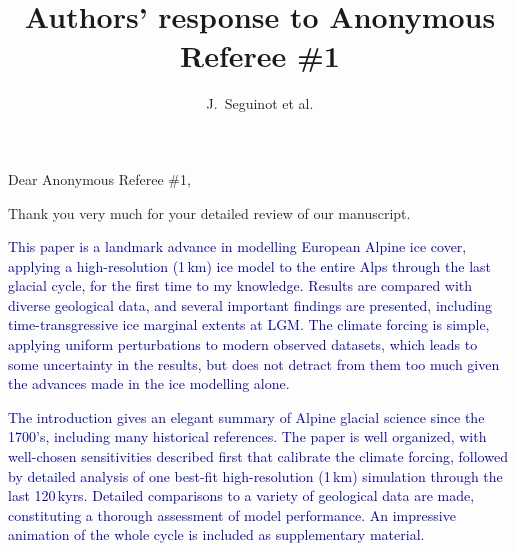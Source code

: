 

\title{Authors' response to Anonymous Referee \#1}
\author{J.~Seguinot et al.}


\maketitle
\bigskip


\newcommand{\sechead}[1]{\bigskip\noindent\textbf{#1}}
\newcommand{\referee}[1]{\bigskip\noindent\textcolor{darkblue}{#1}}
\newcommand{\msquote}[1]{\begin{quote}\textit{#1}\end{quote}}
\newcommand{\doi}[1]{doi:\allowbreak\href{http://dx.doi.org/#1}{#1}}

    Dear Anonymous Referee \#1,

    Thank you very much for your detailed review of our manuscript.

    \referee{%
        This paper is a landmark advance in modelling European Alpine ice
        cover, applying a high-resolution (1\,km) ice model to the entire Alps
        through the last glacial cycle, for the first time to my knowledge.
        Results are compared with diverse geological data, and several
        important findings are presented, including time-transgressive ice
        marginal extents at LGM. The climate forcing is simple, applying
        uniform perturbations to modern observed datasets, which leads to some
        uncertainty in the results, but does not detract from them too much
        given the advances made in the ice modelling alone.}

    \referee{%
        The introduction gives an elegant summary of Alpine glacial science
        since the 1700's, including many historical references. The paper is
        well organized, with well-chosen sensitivities described first that
        calibrate the climate forcing, followed by detailed analysis of one
        best-fit high-resolution (1\,km) simulation through the last 120\,kyrs.
        Detailed comparisons to a variety of geological data are made,
        constituting a thorough assessment of model performance. An impressive
        animation of the whole cycle is included as supplementary material.}

